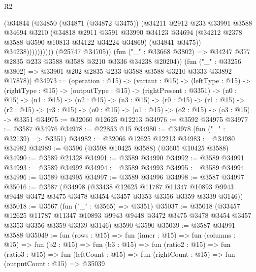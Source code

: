 \begin{lexlean}{R2}
\begin{coremodule}
                        (@34844
                          (@34850
                            (@34871 (@34872 @3475))
                            (@34211
                              @2912
                              @233
                              @33991
                              @3588
                              @34694
                              @3210
                              (@34818
                                @2911
                                @3591
                                @33990
                                @34123
                                @34694
                                (@34212 @2378 @3588 @3590 @10813 @34122 @34224 @34869)
                                (@34841 @3475))
                              @34238))))))))))
          (@25747 @34705))
        (fun ("_" : @33668 @3802) => @34247 @377 @2835 @233 @3588 @3588 @3210 @3336 @34238 @20204))
      (fun ("_" : @33256 @3802) => @33901 @202 @2835 @233 @3588 @3588 @3210 @3333 @33892 @17878))
@34973 := (operation : @15) ->
  (variant : @15) ->
  (leftType : @15) ->
  (rightType : @15) ->
  (outputType : @15) ->
  (rightPresent : @3351) ->
  (n0 : @15) ->
  (n1 : @15) ->
  (n2 : @15) ->
  (n3 : @15) ->
  (r0 : @15) ->
  (r1 : @15) ->
  (r2 : @15) -> (r3 : @15) -> (o0 : @15) -> (o1 : @15) -> (o2 : @15) -> (o3 : @15) -> @3351
@34975 := @32060 @12625 @12213
@34976 := @3592 @34975
@34977 := @3587 @34976
@34978 := @22853 @15
@34980 := @34978 (fun ("_" : @32139) => @3351)
@34982 := @32066 @12625 @12213
@34983 := @34980 @34982
@34989 := @3596 (@3598 @10425 @3588) (@3605 @10425 @3588)
@34990 := @3589 @21328
@34991 := @3589 @34990
@34992 := @3589 @34991
@34993 := @3589 @34992
@34994 := @3589 @34993
@34995 := @3589 @34994
@34996 := @3589 @34995
@34997 := @3589 @34996
@34998 := @3587 @34997
@35016 := @3587
    (@34998
      (@33438
        @12625
        @11787
        @11347
        @10893
        @9943
        @9448
        @3472
        @3475
        @3478
        @3454
        @3457
        @3353
        @3356
        @3359
        @3339
        @3146))
@35018 := @3567 (fun ("_" : @3565) => @3351)
@35037 := @35018
    (@33457
      @12625
      @11787
      @11347
      @10893
      @9943
      @9448
      @3472
      @3475
      @3478
      @3454
      @3457
      @3353
      @3356
      @3359
      @3339
      @3146)
    @3590
    @3590
@35039 := @3587 @34991 @3588
@35049 := fun (rows : @15) =>
  fun (inner : @15) =>
  fun (columns : @15) =>
  fun (b2 : @15) =>
  fun (b3 : @15) =>
  fun (ratio2 : @15) =>
  fun (ratio3 : @15) =>
  fun (leftCount : @15) => fun (rightCount : @15) => fun (outputCount : @15) => @35039

\end{coremodule}
\end{lexlean}
